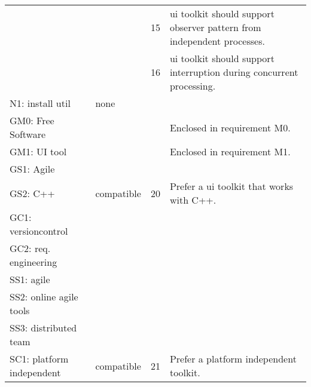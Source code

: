 \begin{center}
\begin{longtable}{ll||cp{13em}}
	                         &              & 15  & ui toolkit should support observer pattern from independent processes.\\
	                         &              & 16  & ui toolkit should support interruption during concurrent processing.\\
        N1: install util     & none    		&     & \\\hline
		GM0: Free Software  &              &     & Enclosed in requirement M0.\\
        GM1: UI tool	    &              &     & Enclosed in requirement M1.\\
        GS1: Agile	        &              &     & \\
        GS2: C++	        & compatible   & 20  & Prefer a ui toolkit that works with C++.\\
        GC1: versioncontrol &              &     & \\
        GC2: req. engineering
						    &              &     & \\\hline
        SS1: agile	        &              &     & \\
        SS2: online agile tools
							&              &     & \\
        SS3: distributed team
							&              &     & \\
        SC1: platform independent
							& compatible   & 21  & Prefer a platform independent toolkit.\\
    \end{longtable}
    \label{tab:uitool-requirements}
\end{center}
